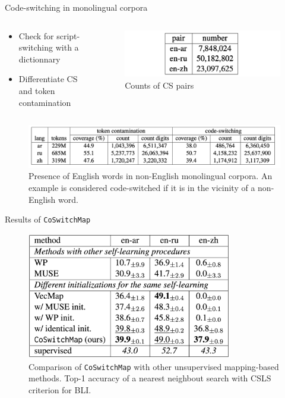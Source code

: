 \documentclass[english]{beamer}
\begin{document}
\begin{frame}{Code-switching in monolingual corpora}
	\begin{columns}
	\begin{column}{0.45\linewidth}
		\begin{itemize}
			\item Check for script-switching with a dictionnary
			\item Differentiate CS and token contamination
		\end{itemize}
	\end{column}
	\begin{column}{0.45\linewidth}
		\begin{figure}
			\centering
			\includegraphics[width=\textwidth]{cs-pairs.png}
			\caption{\centering Counts of CS pairs}
		\end{figure}
	\end{column}
	\end{columns}

	\begin{figure}
		\centering
		\includegraphics[width=\textwidth]{results.png}
		\caption{\centering Presence of English words in non-English monolingual corpora. An example is considered code-switched if it is in the vicinity of a non-English word.}
	\end{figure}
\end{frame}

\begin{frame}{Results of \texttt{CoSwitchMap}}
	\begin{figure}
		\centering
		\includegraphics[width=0.80\textwidth]{results-coswitchmap.png}
		\caption{\centering Comparison of \texttt{CoSwitchMap} with other unsupervised mapping-based methods. Top-1 accuracy of a nearest neighbout search with CSLS criterion for BLI.}
	\end{figure}
\end{frame}
\end{document}
